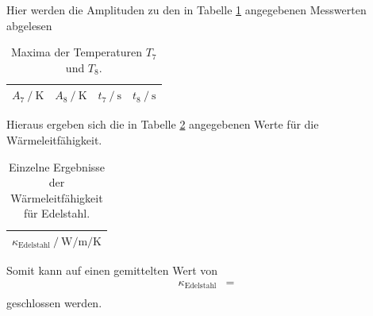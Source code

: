 Hier werden die Amplituden zu den in Tabelle \ref{tab:7} angegebenen Messwerten abgelesen
\begin{table}
  \centering
  \caption{Maxima der Temperaturen $T_7$ und $T_8$.}
  \label{tab:7}
  \begin{tabular}{c c c c}
    \toprule
    {$A_7 \:/\: \si{\kelvin}$} & {$A_8 \:/\: \si{\kelvin}$}  & {$t_7 \:/\: \si{\second}$}  & {$t_8 \:/\: \si{\second}$}\\
    \midrule
    
    \bottomrule
  \end{tabular}
\end{table}
Hieraus ergeben sich die in Tabelle \ref{tab:8} angegebenen Werte für die Wärmeleitfähigkeit.
\begin{table}
  \centering
  \caption{Einzelne Ergebnisse der Wärmeleitfähigkeit für Edelstahl.}
  \label{tab:8}
  \begin{tabular}{c}
    \toprule
    {$\kappa_\text{Edelstahl} \:/\: \si{\watt\per\metre\per\kelvin}$}\\
    \midrule
    
    \bottomrule
  \end{tabular}
\end{table}
Somit kann auf einen gemittelten Wert von
\begin{align*}
  \kappa_\text{Edelstahl} &=  \\
\end{align*}
geschlossen werden.
%    
%
